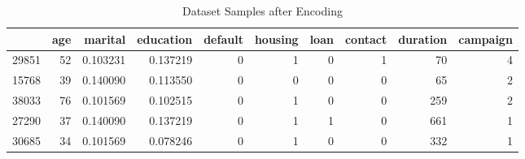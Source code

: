 \documentclass[11pt,a4paper]{article}
\begin{document}






    \begin{table}[ht]
        \centering
        \begin{tabular}{lrrrrrrrrr}
            {} &  age &   marital &  education &  default &  housing &  loan &  contact &  duration &  campaign \\
            \hline \hline
            29851 &   52 &  0.103231 &   0.137219 &        0 &        1 &     0 &        1 &        70 &         4 \\
            15768 &   39 &  0.140090 &   0.113550 &        0 &        0 &     0 &        0 &        65 &         2 \\
            38033 &   76 &  0.101569 &   0.102515 &        0 &        1 &     0 &        0 &       259 &         2 \\
            27290 &   37 &  0.140090 &   0.137219 &        0 &        1 &     1 &        0 &       661 &         1 \\
            30685 &   34 &  0.101569 &   0.078246 &        0 &        1 &     0 &        0 &       332 &         1 \\
        \end{tabular}
        \caption{Dataset Samples after Encoding}
        \label{tab:samples_encoded}
    \end{table}
    
\end{document}
